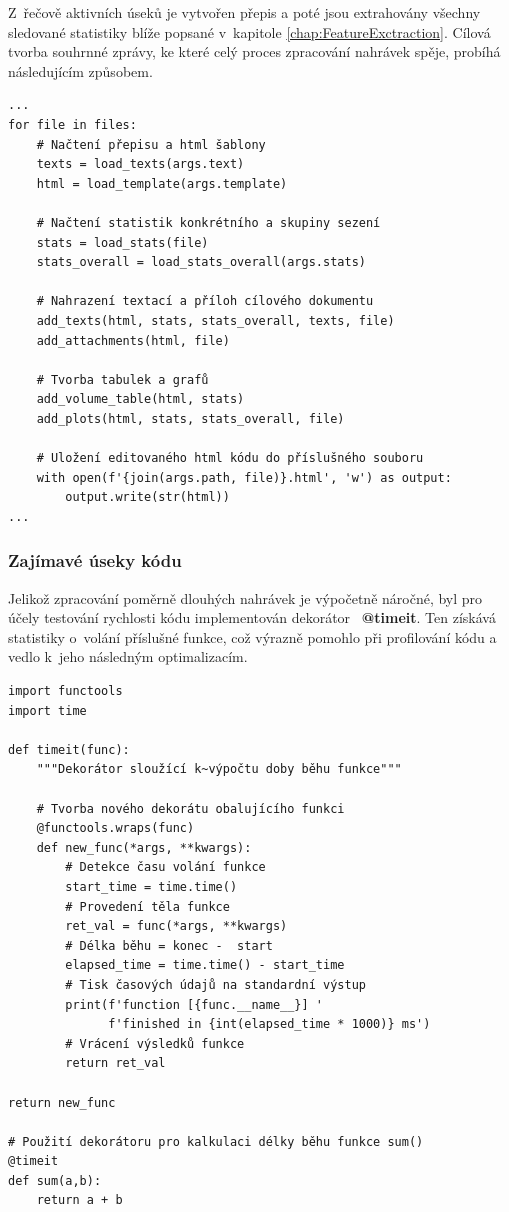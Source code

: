 Z~řečově aktivních úseků je vytvořen přepis a poté jsou extrahovány všechny sledované statistiky blíže popsané v~kapitole \ref{chap:FeatureExctraction}. Cílová tvorba souhrnné zprávy, ke které celý proces zpracování nahrávek spěje, probíhá následujícím způsobem.

\begin{verbatim}
...
for file in files:
    # Načtení přepisu a html šablony
    texts = load_texts(args.text)
    html = load_template(args.template)
    
    # Načtení statistik konkrétního a skupiny sezení
    stats = load_stats(file)
    stats_overall = load_stats_overall(args.stats)
    
    # Nahrazení textací a příloh cílového dokumentu
    add_texts(html, stats, stats_overall, texts, file)
    add_attachments(html, file)
    
    # Tvorba tabulek a grafů
    add_volume_table(html, stats)
    add_plots(html, stats, stats_overall, file)
    
    # Uložení editovaného html kódu do příslušného souboru 
    with open(f'{join(args.path, file)}.html', 'w') as output:
        output.write(str(html))
...
\end{verbatim}

\subsubsection{Zajímavé úseky kódu}
Jelikož zpracování poměrně dlouhých nahrávek je výpočetně náročné, byl pro účely testování rychlosti kódu implementován dekorátor~\cite{python_decorator} \textbf{@timeit}. Ten získává statistiky o~volání příslušné funkce, což výrazně pomohlo při profilování kódu a vedlo k~jeho následným optimalizacím.

\begin{verbatim}
import functools
import time

def timeit(func):
    """Dekorátor sloužící k~výpočtu doby běhu funkce"""
    
    # Tvorba nového dekorátu obalujícího funkci
    @functools.wraps(func)
    def new_func(*args, **kwargs):
        # Detekce času volání funkce
        start_time = time.time()
        # Provedení těla funkce
        ret_val = func(*args, **kwargs)
        # Délka běhu = konec -  start
        elapsed_time = time.time() - start_time
        # Tisk časových údajů na standardní výstup
        print(f'function [{func.__name__}] '
              f'finished in {int(elapsed_time * 1000)} ms')
        # Vrácení výsledků funkce
        return ret_val
        
return new_func

# Použití dekorátoru pro kalkulaci délky běhu funkce sum()
@timeit
def sum(a,b):
    return a + b
\end{verbatim}


